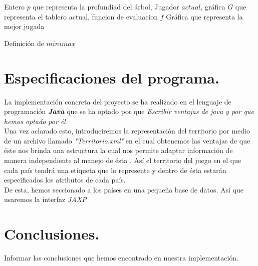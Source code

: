 \documentclass[12pt,twocolumn,draft]{article}
\begin{document}
\begin{algorithm}
\begin{algorithmic}[1]
\REQUIRE Entero $p$ que representa la profundiad del \'arbol, Jugador $actual$, gr\'afica $G$ que representa el tablero actual,
funcion de evaluacion $f$
\ENSURE  Gr\'afica que representa la mejor jugada
\ELSE
{}
\ENDIF
{}
\ELSE
{}
\ENDIF
\ELSE
{}
\ENDIF
\ENDIF
\ENDFOR
\ENDIF
{}
\end{algorithmic}
\caption{Definici\'on de $minimax$}
\label{minimax}
\end{algorithm}



\section{Especificaciones del programa.}

La implementaci\'on concreta del proyecto se ha realizado en el lenguaje de programaci\'on \textbf{\textit{Java}}\cite{JAVA} que se ha optado por que \textit{Escribir ventajas de java y por que hemos optado por \'el}\\

Una vez aclarado esto, introduciremos la representaci\'on del territorio por medio de un archivo llamado \textit{"Territorio.xml"} en el cual obtenemos las ventajas de que \'este nos brinda una estructura la cual nos permite adaptar informaci\'on de manera independiente al manejo de \'esta \cite{xml}. As\'i el territorio del juego en el que cada pa\'is tendr\'a una etiqueta que lo represente y dentro de \'esta estar\'an especificados los atributos de cada pa\'is.\\

De esta, hemos seccionado a los pa\'ises en una peque\~na base de datos. As\'i que usaremos la interfaz \textit{JAXP}\cite{JAXP}

\section{Conclusiones.}
Informar las conclusiones que hemos encontrado en nuestra implementaci\'on.\\


\newpage
	
{}
\end{document}
